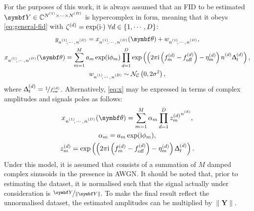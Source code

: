 For the purposes of this work, it is always assumed that an \ac{FID} to be
estimated
$\bY \in \mathbb{C}^{\None \times \cdots \times \ND}$
is hypercomplex in form, meaning that it obeys
\cref{eq:general-fid} with $\zeta^{(d)} = \exp(\mathrm{i} \cdot)\ \forall d \in
\lbrace 1, \cdots, D \rbrace$:
\begin{subequations}
    \begin{gather}
        \ynonenD = \xnonenD(\bth) + \wnonenD,\\
        \xnonenD(\bth) =
        \sumM \amexpphim
        \prodD \exp\left(\left(
            2 \pi \iu \left(f^{(d)}_m - \foffd\right)
            -\eta_m^{(d)}\right)
            \nd \Dtd\right),\label{eq:x}\\
        \wnonenD \sim \mathcal{N_C}\left(0, 2\sigma^2\right),%
        \label{eq:complex-normal}
    \end{gather}%
    \label{eq:hypercomplex-fid}%
\end{subequations}%
where $\Updelta_t^{(d)} = \nicefrac{1}{f_{\mathrm{sw}}^{(d)}}$.
Alternatively, \cref{eq:x} may be expressed in terms of complex amplitudes and
signals poles as follows:
\begin{subequations}%
    \begin{gather}%
        \xnonenD(\bth) = \sumM \alpha_m \prodD {z^{(d)}_m}^{\nd},\\
        \alpha_m = \amexpphim,\\
        z_m^{(d)} = \exp\left(
            \left(2 \pi \iu \left(f_m^{(d)} - \foffd\right) - \eta^{(d)}_m\right) \Dtd
        \right).%
    \end{gather}%
    \label{eq:x-alpha-z}%
\end{subequations}%
Under this model, it is assumed that
 consists of a summation of $M$ damped complex sinusoids in the
presence in \ac{AWGN}.
It should be noted that, prior to estimating the dataset, it is normalised
such that the signal actually under consideration is $\nicefrac{\bY}{\lVert \bY
\rVert}$.
To make the final result reflect the unnormalised dataset, the estimated
amplitudes can be multiplied by $\lVert \symbf{Y} \rVert$.

